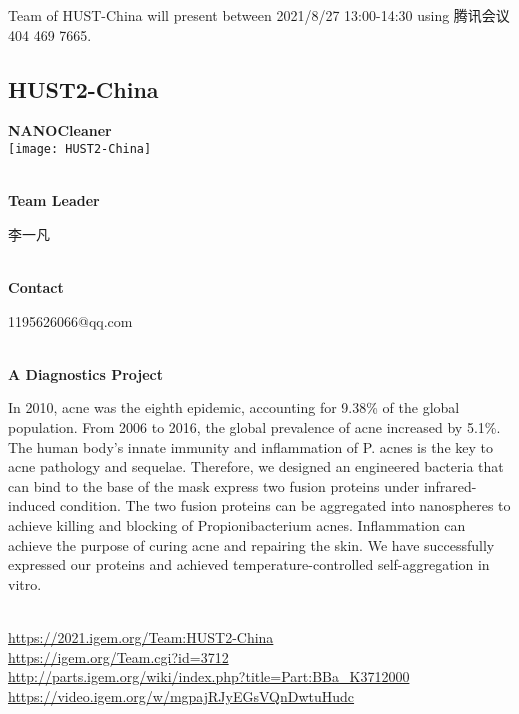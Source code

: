 Team of HUST-China will present between 2021/8/27 13:00-14:30        using 腾讯会议 404 469 7665.
\newpage


\subsection{\textcolor{Blu}{ HUST2-China } }
\vspace{5mm}
\begin{center}
\large{
  \textbf{ NANOCleaner }\\
  \texttt{[image: HUST2-China]}
}
\end{center}
\textbf{\\Team Leader}

  李一凡


\textbf{\\Contact}

  1195626066@qq.com


\textbf{\\A Diagnostics Project\\}\begin{spacing}{1.5}

In 2010, acne was the eighth epidemic, accounting for 9.38\% of the global population. From 2006 to 2016, the global prevalence of acne increased by 5.1\%. The human body’s innate immunity and inflammation of P. acnes is the key to acne pathology and sequelae. Therefore, we designed an engineered bacteria that can bind to the base of the mask express two fusion proteins under infrared-induced condition. The two fusion proteins can be aggregated into nanospheres to achieve killing and blocking of Propionibacterium acnes. Inflammation can achieve the purpose of curing acne and repairing the skin. We have successfully expressed our proteins and achieved temperature-controlled self-aggregation in vitro.\end{spacing}
\\

\url{https://2021.igem.org/Team:HUST2-China }\\
\url{https://igem.org/Team.cgi?id=3712 }\\
\url{http://parts.igem.org/wiki/index.php?title=Part:BBa_K3712000 }\\
\url{https://video.igem.org/w/mgpajRJyEGsVQnDwtuHudc }\\

\vfill{}









